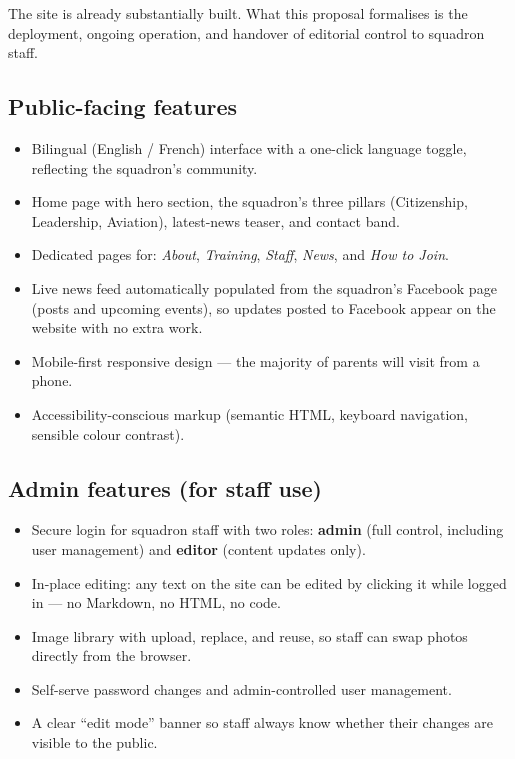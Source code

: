 \documentclass[11pt,letterpaper]{article}
\begin{document}
The site is already substantially built. What this proposal formalises is the deployment, ongoing operation, and handover of editorial control to squadron staff.

\subsection{Public-facing features}
\begin{itemize}[leftmargin=1.4em,itemsep=0.25em]
  \item Bilingual (English / French) interface with a one-click language toggle, reflecting the squadron's community.
  \item Home page with hero section, the squadron's three pillars (Citizenship, Leadership, Aviation), latest-news teaser, and contact band.
  \item Dedicated pages for: \emph{About}, \emph{Training}, \emph{Staff}, \emph{News}, and \emph{How to Join}.
  \item Live news feed automatically populated from the squadron's Facebook page (posts and upcoming events), so updates posted to Facebook appear on the website with no extra work.
  \item Mobile-first responsive design --- the majority of parents will visit from a phone.
  \item Accessibility-conscious markup (semantic HTML, keyboard navigation, sensible colour contrast).
\end{itemize}

\subsection{Admin features (for staff use)}
\begin{itemize}[leftmargin=1.4em,itemsep=0.25em]
  \item Secure login for squadron staff with two roles: \textbf{admin} (full control, including user management) and \textbf{editor} (content updates only).
  \item In-place editing: any text on the site can be edited by clicking it while logged in --- no Markdown, no HTML, no code.
  \item Image library with upload, replace, and reuse, so staff can swap photos directly from the browser.
  \item Self-serve password changes and admin-controlled user management.
  \item A clear ``edit mode'' banner so staff always know whether their changes are visible to the public.
\end{itemize}
\end{document}
